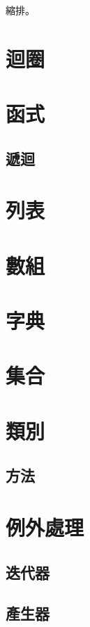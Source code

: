 \documentclass[a4paper,12pt]{book}
\theoremstyle{definition}
\begin{document}
縮排。

\chapter{迴圈}
%
\label{c:loop}

\chapter{函式}
%
\label{c:function}

\section{遞迴}

\chapter{列表}
%
\label{c:list}

\chapter{數組}
%
\label{c:tuple}

\chapter{字典}
%
\label{c:dict}

\chapter{集合}
%
\label{c:set}

\chapter{類別}
%
\label{c:class}

\section{方法}

\chapter{例外處理}
%
\label{c:exception}

\section{迭代器}

\section{產生器}
\end{document}
